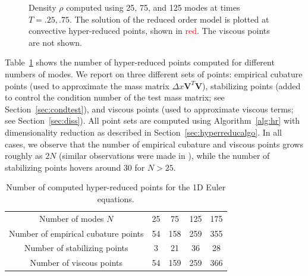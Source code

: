 \documentclass[preprint,10pt]{elsarticle}
\theoremstyle{definition}
\theoremstyle{lemma}
\theoremstyle{theorem}
\theoremstyle{assumption}
\begin{document}
\begin{figure}[!h]
\caption{Density $\rho$ computed using 25, 75, and 125 modes at times $T=.25, .75$.  The solution of the reduced order model is plotted at convective hyper-reduced points, shown in \textcolor{red}{red}.  The viscous points are not shown.}
\label{fig:romsols}
\end{figure}

Table~\ref{tab:hrpts} shows the number of hyper-reduced points computed for different numbers of modes.  We report on three different sets of points: empirical cubature points (used to approximate the mass matrix $\Delta x \bm{V}^T\bm{V}$), stabilizing points (added to control the condition number of the test mass matrix; see Section~\ref{sec:condtest}), and viscous points (used to approximate viscous terms; see Section~\ref{sec:diss}).  All point sets are computed using Algorithm~\ref{alg:hr} with dimensionality reduction as described in Section~\ref{sec:hyperreducalgo}.  In all cases, we observe that the number of empirical cubature and viscous points grows roughly as $2N$ (similar observations were made in \cite{hernandez2017dimensional}), while the number of stabilizing points hovers around $30$ for $N > 25$.  

\begin{table}[!h]
\centering
\begin{tabular}{|c || c | c | c |c |}
\hline
Number of modes $N$ & 25 & 75 & 125 & 175\\
\hhline{|=|=|=|=|=|}
Number of empirical cubature points &54 & 158 & 259 &355 \\
\hline
Number of stabilizing points & 3& 21 & 36 & 28 \\
\hline
Number of viscous points & 54 &159 & 259 & 366  \\
\hline
\end{tabular}
\caption{Number of computed hyper-reduced points for the 1D Euler equations.}
\label{tab:hrpts}
\end{table}
\end{document}
